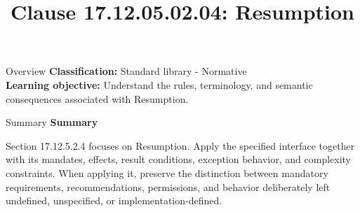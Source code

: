 \documentclass[10pt,letterpaper]{article}
\title{Clause 17.12.05.02.04: Resumption}
\author{}
\date{}
\begin{document}
\maketitle
\begin{CornellOverviewBox}{Overview}
\textbf{Classification:} Standard library - Normative\\[2pt]
\textbf{Learning objective:} Understand the rules, terminology, and semantic consequences associated with Resumption.
\end{CornellOverviewBox}\begin{CornellSummaryBox}{Summary}
{\sffamily\bfseries\color{Accent} Summary}\par\vspace{3pt}Section 17.12.5.2.4 focuses on Resumption. Apply the specified interface together with its mandates, effects, result conditions, exception behavior, and complexity constraints. When applying it, preserve the distinction between mandatory requirements, recommendations, permissions, and behavior deliberately left undefined, unspecified, or implementation-defined.
\end{CornellSummaryBox}
\end{document}
